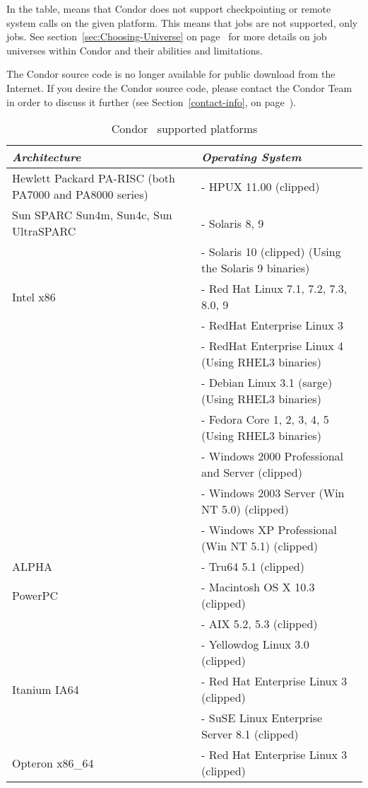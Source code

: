 In the table,  means that Condor does not support
checkpointing or remote system calls on the given platform. 
This means that  jobs are not supported, only
 jobs.
See section~\ref{sec:Choosing-Universe} on
page~\pageref{sec:Choosing-Universe} for more details on job universes
within Condor and their abilities and limitations.

The Condor source code is no longer available for public download from the Internet.  If you 
desire the Condor source code, please contact the Condor Team in order to discuss it further 
(see Section~\ref{contact-info}, on page~\pageref{contact-info}).

\begin{center}
\begin{table}[hbt]
\begin{tabular}{|p{6cm}p{7cm}|} \hline
\emph{Architecture} & \emph{Operating System} \\ \hline \hline
Hewlett Packard PA-RISC (both PA7000 and PA8000 series) & - HPUX 11.00 (clipped) \\ \hline
Sun SPARC Sun4m, Sun4c, Sun UltraSPARC & - Solaris 8, 9 \\
 & - Solaris 10 (clipped) (Using the Solaris 9 binaries) \\ \hline
Intel x86 & - Red Hat Linux 7.1, 7.2, 7.3, 8.0, 9 \\
 & - RedHat Enterprise Linux 3 \\
 & - RedHat Enterprise Linux 4 (Using RHEL3 binaries) \\
 & - Debian Linux 3.1 (sarge) (Using RHEL3 binaries) \\
 & - Fedora Core 1, 2, 3, 4, 5 (Using RHEL3 binaries) \\
 & - Windows 2000 Professional and Server (clipped) \\
 & - Windows 2003 Server (Win NT 5.0) (clipped) \\
 & - Windows XP Professional (Win NT 5.1) (clipped) \\ \hline
ALPHA & - Tru64 5.1 (clipped) \\ \hline
PowerPC & - Macintosh OS X 10.3 (clipped) \\
 & - AIX 5.2, 5.3 (clipped) \\
 & - Yellowdog Linux 3.0 (clipped) \\ \hline
Itanium IA64 & - Red Hat Enterprise Linux 3 (clipped) \\
 & - SuSE Linux Enterprise Server 8.1 (clipped) \\ \hline
Opteron x86\_64 & - Red Hat Enterprise Linux 3 (clipped) \\ \hline
\end{tabular}
\caption{\label{supported-platforms}Condor \VersionNotice\ supported platforms}
\end{table}
\end{center}



